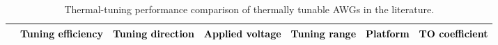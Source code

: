     \begin{table}[!b]
		\caption{\label{tab:ttawgcompare}
		Thermal-tuning performance comparison of thermally tunable AWGs in the literature.}
		\centering
		\begin{tabular}{|M{0.76in}|M{0.61in}|M{0.68in}|M{0.76in}|M{0.5in}|M{0.55in}|M{0.89in}|}	\hline %
             & 
            \textcolor{black}{Tuning efficiency} & 
            \textcolor{black}{Tuning direction} & 
            \textcolor{black}{Applied voltage} & 
            \textcolor{black}{Tuning range} & 
            \textcolor{black}{Platform} & 
            \textcolor{black}{TO coefficient} \\ \hline
            

\end{tabular}
\end{table}
